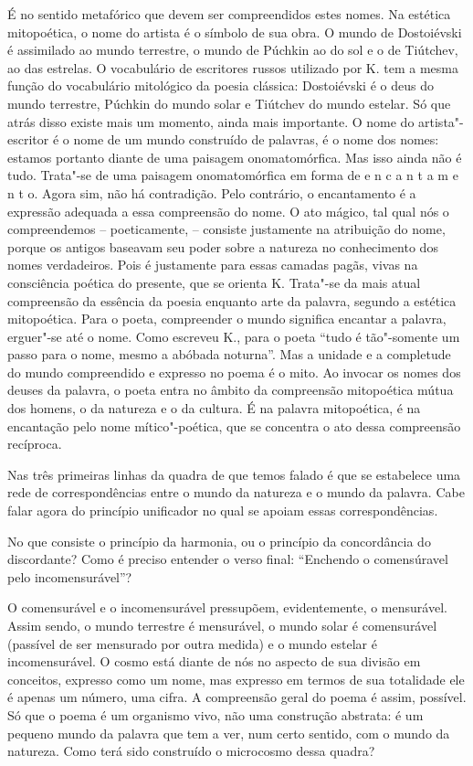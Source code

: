 É no sentido metafórico que devem ser compreendidos estes nomes. Na
estética mitopoética, o nome do artista é o símbolo de sua obra. O mundo
de Dostoiévski é assimilado ao mundo terrestre, o mundo de Púchkin ao do
sol e o de Tiútchev, ao das estrelas. O vocabulário de escritores russos
utilizado por K. tem a mesma função do vocabulário mitológico da poesia
clássica: Dostoiévski é o deus do mundo terrestre, Púchkin do mundo
solar e Tiútchev do mundo estelar. Só que atrás disso existe mais um
momento, ainda mais importante. O nome do artista"-escritor é o nome de
um mundo construído de palavras, é o nome dos nomes: estamos portanto
diante de uma paisagem onomatomórfica. Mas isso ainda não é tudo.
Trata"-se de uma paisagem onomatomórfica em forma de e n c a n t a m e n
t o. Agora sim, não há contradição. Pelo contrário, o encantamento é a
expressão adequada a essa compreensão do nome. O ato mágico, tal qual
nós o compreendemos -- poeticamente, -- consiste justamente na
atribuição do nome, porque os antigos baseavam seu poder sobre a
natureza no conhecimento dos nomes verdadeiros. Pois é justamente para
essas camadas pagãs, vivas na consciência poética do presente, que se
orienta K. Trata"-se da mais atual compreensão da essência da poesia
enquanto arte da palavra, segundo a estética mitopoética. Para o poeta,
compreender o mundo significa encantar a palavra, erguer"-se até o nome.
Como escreveu K., para o poeta ``tudo é tão"-somente um passo para o
nome, mesmo a abóbada noturna''. Mas a unidade e a completude do mundo
compreendido e expresso no poema é o mito. Ao invocar os nomes dos
deuses da palavra, o poeta entra no âmbito da compreensão mitopoética
mútua dos homens, o da natureza e o da cultura. É na palavra
mitopoética, é na encantação pelo nome mítico"-poética, que se concentra
o ato dessa compreensão recíproca.

Nas três primeiras linhas da quadra de que temos falado é que se
estabelece uma rede de correspondências entre o mundo da natureza e o
mundo da palavra. Cabe falar agora do princípio unificador no qual se
apoiam essas correspondências.

No que consiste o princípio da harmonia, ou o princípio da concordância
do discordante? Como é preciso entender o verso final: ``Enchendo o
comensúravel pelo incomensurável''?

O comensurável e o incomensurável pressupõem, evidentemente, o
mensurável. Assim sendo, o mundo terrestre é mensurável, o mundo solar é
comensurável (passível de ser mensurado por outra medida) e o mundo
estelar é incomensurável. O cosmo está diante de nós no aspecto de sua
divisão em conceitos, expresso como um nome, mas expresso em termos de
sua totalidade ele é apenas um número, uma cifra. A compreensão geral do
poema é assim, possível. Só que o poema é um organismo vivo, não uma
construção abstrata: é um pequeno mundo da palavra que tem a ver, num
certo sentido, com o mundo da natureza. Como terá sido construído o
microcosmo dessa quadra?

